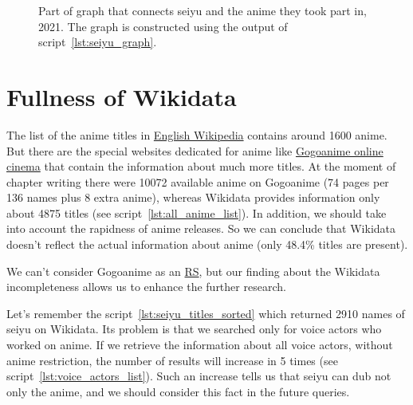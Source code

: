 \begin{figure*}

    \setlength{\fboxsep}{0pt}%
    \setlength{\fboxrule}{1pt}%
	\caption[Part of graph that connects seiyu and the anime they took part in, 2021.]{Part of graph that connects seiyu and the anime they took part in, 2021. The graph is constructed using the output of script~\ref{lst:seiyu_graph}.}%
    \label{fig:Seiyu_graph_en}%
\end{figure*} 

\section{Fullness of Wikidata}

The list of the anime titles in \href{https://w.wiki/4Xs4}{English Wikipedia} contains around \num{1600} anime. But there are the special websites dedicated for anime like \href{https://www1.gogoanime.cm/}{Gogoanime online cinema} that contain the information about much more titles. At the moment of chapter writing there were \num{10072} available anime on Gogoanime (\num{74} pages per \num{136} names plus \num{8} extra anime), whereas Wikidata provides information only about \num{4875} titles (see script~\ref{lst:all_anime_list}). In addition, we should take into account the rapidness of anime releases. So we can conclude that Wikidata doesn't reflect the actual information about anime (only \num{48.4}\% titles are present).

We can't consider Gogoanime as an \href{https://w.wiki/Eiw}{RS}, but our finding about the Wikidata incompleteness allows us to enhance the further research.

Let's remember the script~\protect\ref{lst:seiyu_titles_sorted} which returned \num{2910} names of seiyu on Wikidata. Its problem is that we searched only for voice actors who worked on anime. If we retrieve the information about all voice actors, without anime restriction, the number of results will increase in \num{5} times (see script~\protect\ref{lst:voice_actors_list}). Such an increase tells us that seiyu can dub not only the anime, and we should consider this fact in the future queries.

